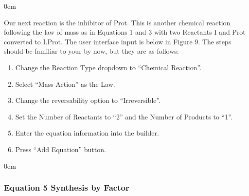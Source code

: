 \documentclass[letterpaper,10pt,english]{sphinxmanual}
\begin{document}
\begin{DUlineblock}{0em}
\item[] 
\end{DUlineblock}

\sphinxAtStartPar
Our next reaction is the inhibitor of Prot. This is another chemical reaction
following the law of mass as in Equations 1 and 3 with two Reactants I and Prot
converted to I.Prot. The user interface input is below in Figure 9.
The steps should be familiar to your by now, but they are as follows:
\begin{enumerate}
%
\item {} 
\sphinxAtStartPar
Change the Reaction Type dropdown to “Chemical Reaction”.

\item {} 
\sphinxAtStartPar
Select “Mass Action” as the Law.

\item {} 
\sphinxAtStartPar
Change the reversability option to “Irreversible”.

\item {} 
\sphinxAtStartPar
Set the Number of Reactants to “2” and the Number of Products to “1”.

\item {} 
\sphinxAtStartPar
Enter the equation information into the builder.

\item {} 
\sphinxAtStartPar
Press “Add Equation” button.

\end{enumerate}


\begin{DUlineblock}{0em}
\item[] 
\end{DUlineblock}


\subsubsection{Equation 5 \sphinxhyphen{} Synthesis by Factor}
\label{\detokenize{pages/tutorial_sc/createEquations:equation-5-synthesis-by-factor}}
\end{document}
